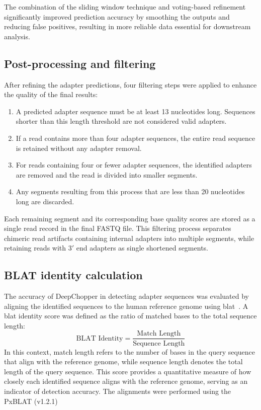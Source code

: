\documentclass[pdflatex,sn-nature, lineno]{sn-jnl}%
\begin{document}
The combination of the sliding window technique and voting-based refinement significantly improved prediction accuracy by smoothing the outputs and reducing false positives, resulting in more reliable data essential for downstream analysis.

\subsection{Post-processing and filtering}

After refining the adapter predictions, four filtering steps were applied to enhance the quality of the final results:
\vspace{.5em}
\begin{enumerate}[leftmargin=2em]
	\item A predicted adapter sequence must be at least 13 nucleotides long. Sequences shorter than this length threshold are not considered valid adapters.
	\item If a read contains more than four adapter sequences, the entire read sequence is retained without any adapter removal.
	\item For reads containing four or fewer adapter sequences, the identified adapters are removed and the read is divided into smaller segments.
	\item Any segments resulting from this process that are less than 20 nucleotides long are discarded.
\end{enumerate}
\vspace{.5em}
Each remaining segment and its corresponding base quality scores are stored as a single read record in the final FASTQ file.
This filtering process separates chimeric read artifacts containing internal adapters into multiple segments, while retaining reads with $3'$ end adapters as single shortened segments.

\subsection{BLAT identity calculation}

The accuracy of DeepChopper in detecting adapter sequences was evaluated by aligning the identified sequences to the human reference genome using \gls{blat}~\cite{kent2002blat}.
A \gls{blat} identity score was defined as the ratio of matched bases to the total sequence length:
\[
	\textrm{BLAT Identity} = \frac{\textrm{Match Length}}{\textrm{Sequence Length}}
\]
In this context, match length refers to the number of bases in the query sequence that align with the reference genome, while sequence length denotes the total length of the query sequence.
This score provides a quantitative measure of how closely each identified sequence aligns with the reference genome, serving as an indicator of detection accuracy.
The alignments were performed using the PxBLAT (v1.2.1)~\cite{li2024pxblat}
\end{document}
